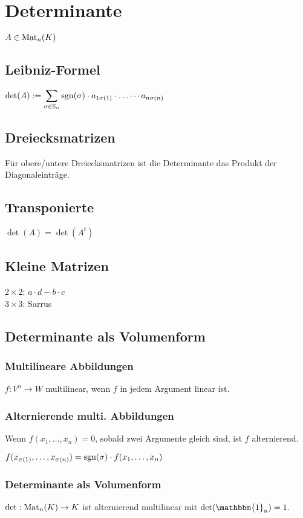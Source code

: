 \section*{Determinante}
$A\in\operatorname{Mat}_n(K)$

\subsection*{Leibniz-Formel}
$\displaystyle \det(A) := \sum_{\sigma\in\mathbb{S}_n} \operatorname{sgn}(\sigma)\cdot a_{1\sigma(1)}\cdot\dots\cdots a_{n\sigma(n)}$

\subsection*{Dreiecksmatrizen}
Für obere/untere Dreiecksmatrizen ist die Determinante
das Produkt der Diagonaleinträge.

\subsection*{Transponierte}
$\det(A) = \det(A^t)$

\subsection*{Kleine Matrizen}
$2\times2$: $a\cdot d - b\cdot c$ \\
$3\times3$: Sarrus

\subsection*{Determinante als Volumenform}

\subsubsection*{Multilineare Abbildungen}
$f:V^n\to W$ multilinear, wenn
$f$ in jedem Argument linear ist.

\subsubsection*{Alternierende multi. Abbildungen}
Wenn $f(x_1,\dots,x_n)=0$, sobald zwei Argumente gleich sind,
ist $f$ alternierend.

$f(x_{\sigma(1)},\dots,x_{\sigma(n)}) = \operatorname{sgn}(\sigma)\cdot f(x_1,\dots,x_n)$

\subsubsection*{Determinante als Volumenform}
$\det : \operatorname{Mat}_n(K)\to K$ ist alternierend multilinear
mit $\det(\mathbbm{1}_n)=1$.

